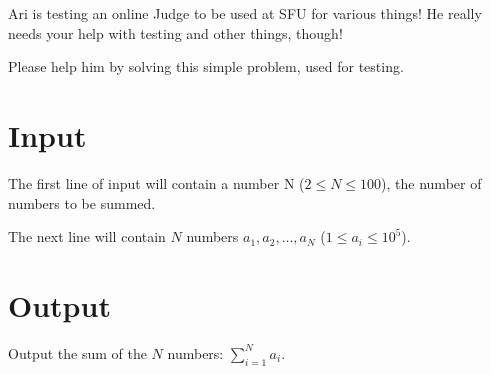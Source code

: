 
Ari is testing an online Judge to be used at SFU for various things! He really needs your help with testing and other things, though!

Please help him by solving this simple problem, used for testing.

\section{Input}

The first line of input will contain a number N ($2 \leq N \leq 100$), the number of numbers to be summed.

The next line will contain $N$ numbers $a_1, a_2, \dots, a_N$ ($1 \leq a_i \leq 10^5$).

\section{Output}

Output the sum of the $N$ numbers: $\displaystyle \sum_{i=1}^N a_i$.